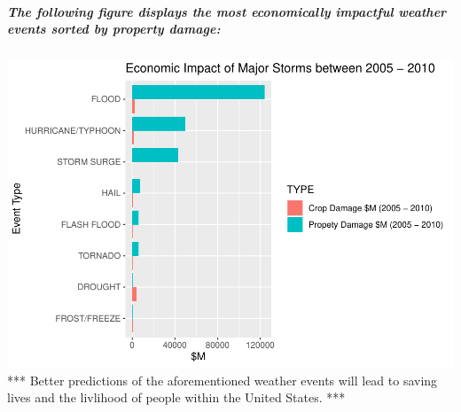 \documentclass[]{article}
\newenvironment{Shaded}{\begin{snugshade}}{\end{snugshade}}
\newcommand{\DataTypeTok}[1]{\textcolor[rgb]{0.13,0.29,0.53}{#1}}
\newcommand{\KeywordTok}[1]{\textcolor[rgb]{0.13,0.29,0.53}{\textbf{#1}}}
\newcommand{\NormalTok}[1]{#1}
\newcommand{\OperatorTok}[1]{\textcolor[rgb]{0.81,0.36,0.00}{\textbf{#1}}}
\newcommand{\StringTok}[1]{\textcolor[rgb]{0.31,0.60,0.02}{#1}}
\let\oldsubparagraph\subparagraph
\renewcommand{\subparagraph}[1]{\oldsubparagraph{#1}\mbox{}}
\begin{document}
\hypertarget{the-following-figure-displays-the-most-economically-impactful-weather-events-sorted-by-property-damage}{%
\subparagraph{The following figure displays the most economically
impactful weather events sorted by property
damage:}\label{the-following-figure-displays-the-most-economically-impactful-weather-events-sorted-by-property-damage}}

\begin{Shaded}
\end{Shaded}

\includegraphics{NOAA_Storm_Analysis_files/figure-latex/unnamed-chunk-9-1.pdf}
*** Better predictions of the aforementioned weather events will lead to
saving lives and the livlihood of people within the United States. ***
\end{document}
